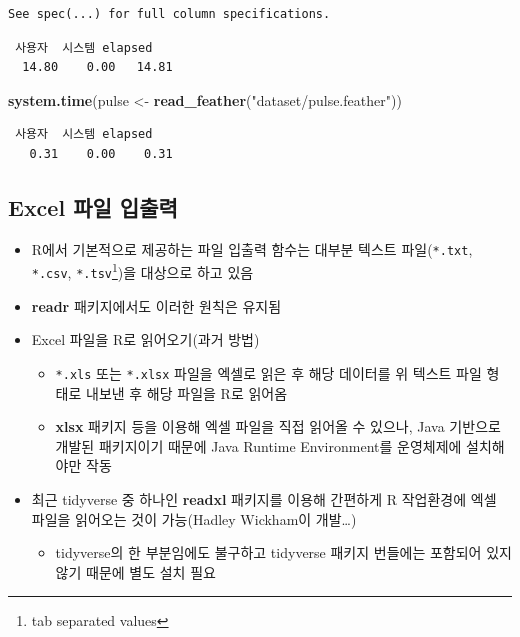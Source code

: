 \documentclass[
  11pt,
]{krantz}
\newenvironment{Shaded}{\begin{snugshade}}{\end{snugshade}}
\newcommand{\KeywordTok}[1]{\textcolor[rgb]{0.27,0.27,0.27}{\textbf{#1}}}
\newcommand{\NormalTok}[1]{#1}
\newcommand{\StringTok}[1]{\textcolor[rgb]{0.5,0.5,0.5}{#1}}
\providecommand{\tightlist}{%
  \setlength{\itemsep}{0pt}\setlength{\parskip}{0pt}}
\begin{document}
\begin{verbatim}
See spec(...) for full column specifications.
\end{verbatim}

\begin{verbatim}
 사용자  시스템 elapsed 
  14.80    0.00   14.81 
\end{verbatim}

\begin{Shaded}
\begin{Highlighting}[]
\KeywordTok{system.time}\NormalTok{(pulse <-}\StringTok{ }\KeywordTok{read_feather}\NormalTok{(}\StringTok{"dataset/pulse.feather"}\NormalTok{))}
\end{Highlighting}
\end{Shaded}

\begin{verbatim}
 사용자  시스템 elapsed 
   0.31    0.00    0.31 
\end{verbatim}

\normalsize

\hypertarget{import-export-excel}{%
\subsection{Excel 파일 입출력}\label{import-export-excel}}

\begin{itemize}
\tightlist
\item
  R에서 기본적으로 제공하는 파일 입출력 함수는 대부분 텍스트 파일(\texttt{*.txt}, \texttt{*.csv}, \texttt{*.tsv}\footnote{tab separated values})을 대상으로 하고 있음
\item
  \textbf{readr} 패키지에서도 이러한 원칙은 유지됨
\item
  Excel 파일을 R로 읽어오기(과거 방법)

  \begin{itemize}
  \tightlist
  \item
    \texttt{*.xls} 또는 \texttt{*.xlsx} 파일을 엑셀로 읽은 후 해당 데이터를 위 텍스트 파일 형태로 내보낸 후 해당 파일을 R로 읽어옴
  \item
    \textbf{xlsx} 패키지 등을 이용해 엑셀 파일을 직접 읽어올 수 있으나, Java 기반으로 개발된 패키지이기 때문에 Java Runtime Environment를 운영체제에 설치해야만 작동
  \end{itemize}
\item
  최근 tidyverse 중 하나인 \textbf{readxl} 패키지를 이용해 간편하게 R 작업환경에 엑셀 파일을 읽어오는 것이 가능(Hadley Wickham이 개발\ldots)

  \begin{itemize}
  \tightlist
  \item
    tidyverse의 한 부분임에도 불구하고 tidyverse 패키지 번들에는 포함되어 있지 않기 때문에 별도 설치 필요
  \end{itemize}
\end{itemize}
\end{document}
